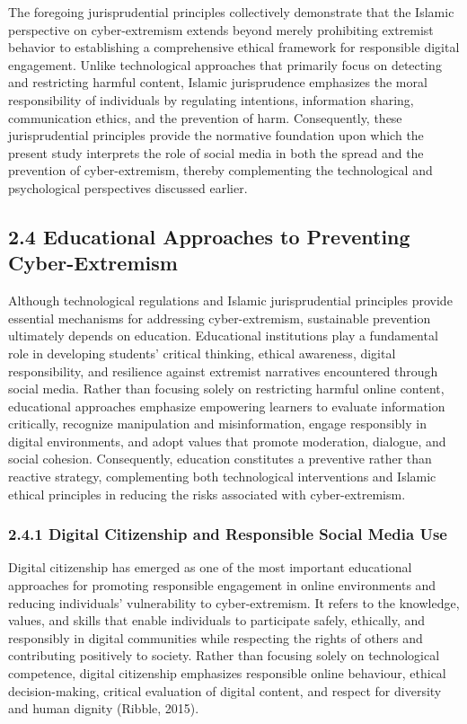 \documentclass[10pt]{NSP1}
\begin{document}
	The foregoing jurisprudential principles collectively demonstrate that the Islamic perspective on cyber-extremism extends beyond merely prohibiting extremist behavior to establishing a comprehensive ethical framework for responsible digital engagement. Unlike technological approaches that primarily focus on detecting and restricting harmful content, Islamic jurisprudence emphasizes the moral responsibility of individuals by regulating intentions, information sharing, communication ethics, and the prevention of harm. Consequently, these jurisprudential principles provide the normative foundation upon which the present study interprets the role of social media in both the spread and the prevention of cyber-extremism, thereby complementing the technological and psychological perspectives discussed earlier.
	
	\subsection*{2.4 Educational Approaches to Preventing Cyber-Extremism}
	
	Although technological regulations and Islamic jurisprudential principles provide essential mechanisms for addressing cyber-extremism, sustainable prevention ultimately depends on education. Educational institutions play a fundamental role in developing students' critical thinking, ethical awareness, digital responsibility, and resilience against extremist narratives encountered through social media. Rather than focusing solely on restricting harmful online content, educational approaches emphasize empowering learners to evaluate information critically, recognize manipulation and misinformation, engage responsibly in digital environments, and adopt values that promote moderation, dialogue, and social cohesion. Consequently, education constitutes a preventive rather than reactive strategy, complementing both technological interventions and Islamic ethical principles in reducing the risks associated with cyber-extremism.
	
	\subsubsection*{2.4.1 Digital Citizenship and Responsible Social Media Use}
	
	Digital citizenship has emerged as one of the most important educational approaches for promoting responsible engagement in online environments and reducing individuals' vulnerability to cyber-extremism. It refers to the knowledge, values, and skills that enable individuals to participate safely, ethically, and responsibly in digital communities while respecting the rights of others and contributing positively to society. Rather than focusing solely on technological competence, digital citizenship emphasizes responsible online behaviour, ethical decision-making, critical evaluation of digital content, and respect for diversity and human dignity (Ribble, 2015).
	
\end{document}
